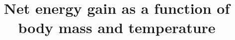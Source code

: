 \documentclass[11pt]{article}
\begin{document}



\title{Net energy gain as a function of body mass and temperature}


\date{}

\maketitle











\linenumbers{}
\modulolinenumbers[2]



% 
\end{document}

